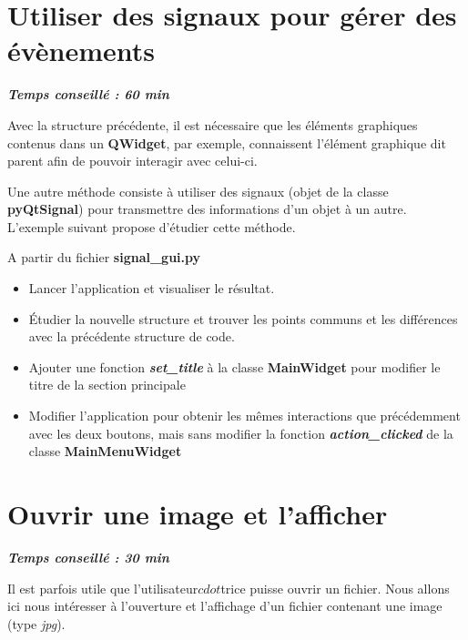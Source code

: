 \documentclass[a4paper,11pt,titlepage]{article} %
\begin{document}
\newpage
\section{Utiliser des signaux pour gérer des évènements}

\begin{center} \textbf{\textit{Temps conseillé : 60 min}} \end{center}

Avec la structure précédente, il est nécessaire que les éléments graphiques contenus dans un \textbf{QWidget}, par exemple, connaissent l'élément graphique dit parent afin de pouvoir interagir avec celui-ci.

Une autre méthode consiste à utiliser des signaux (objet de la classe \textbf{pyQtSignal}) pour transmettre des informations d'un objet à un autre. L'exemple suivant propose d'étudier cette méthode.

A partir du fichier \textbf{signal\_gui.py}

\begin{itemize}
	\item Lancer l'application et visualiser le résultat.
	\item Étudier la nouvelle structure et trouver les points communs et les différences avec la précédente structure de code.
	
	\medskip
	
	\item Ajouter une fonction \textsl{\textbf{set\_title}} à la classe \textbf{MainWidget} pour modifier le titre de la section principale
	\item Modifier l'application pour obtenir les mêmes interactions que précédemment avec les deux boutons, mais sans modifier la fonction \textsl{\textbf{action\_clicked}} de la classe \textbf{MainMenuWidget}
\end{itemize}


\section{Ouvrir une image et l'afficher}

\begin{center} \textbf{\textit{Temps conseillé : 30 min}} \end{center}

Il est parfois utile que l'utilisateur$cdot$trice puisse ouvrir un fichier. Nous allons ici nous intéresser à l'ouverture et l'affichage d'un fichier contenant une image (type \textit{jpg}).
\end{document}
